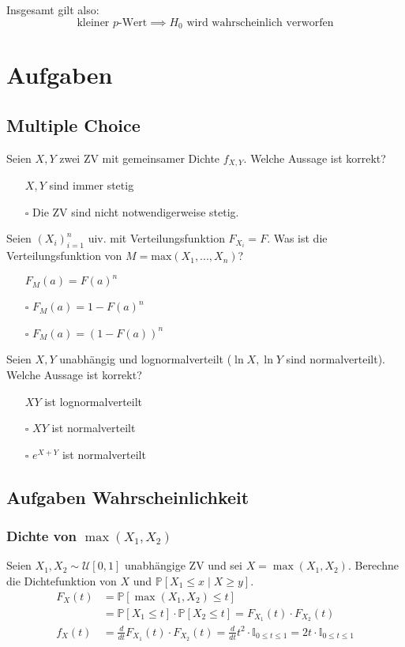\documentclass[a4paper,10pt]{article}
\def\P{\mathbb{P}}
\begin{document}
Insgesamt gilt also:
\[\text{kleiner } p\text{-Wert} \implies H_0 \text{ wird wahrscheinlich verworfen} \]

\section{Aufgaben}
\subsection{Multiple Choice}

Seien \(X,Y\) zwei ZV mit gemeinsamer Dichte \(f_{X,Y}\). Welche Aussage ist korrekt?
\begin{itemize}
	\item[\checkmark] \(X,Y\) sind immer stetig
	\item[\(\square\)] Die ZV sind nicht notwendigerweise stetig.
\end{itemize}

\noindent
Seien \((X_i)_{i = 1}^n\) uiv. mit Verteilungsfunktion \(F_{X_i} = F\). Was ist die Verteilungsfunktion von \(M = \text{max}(X_1,...,X_n)\)?
\begin{itemize}
	\item[\checkmark] \(F_M(a) = F(a)^n\)
	\item[\(\square\)] \(F_M(a) = 1 - F(a)^n\)
	\item[\(\square\)] \(F_M(a) = (1 - F(a))^n\)
\end{itemize}

\noindent
Seien \(X, Y\) unabhängig und lognormalverteilt (\(\ln X, \ln Y\) sind normalverteilt). Welche Aussage ist korrekt?
\begin{itemize}
	\item[\checkmark] \(XY\) ist lognormalverteilt
	\item[\(\square\)] \(XY\) ist normalverteilt
	\item[\(\square\)] \(e^{X + Y}\) ist normalverteilt
\end{itemize}

\subsection{Aufgaben Wahrscheinlichkeit}
\subsubsection*{\texorpdfstring{Dichte von \(\max(X_1,X_2)\)}{Dichte von max()}}

Seien \(X_1, X_2 \sim \mathcal{U}[0,1]\) unabhängige ZV und sei \(X = \max (X_1, X_2)\). Berechne die Dichtefunktion von \(X\) und \(\P[X_1 \leq x \mid X \geq y]\).
\begin{align*}
	F_X(t) & = \P[\max(X_1, X_2) \leq t]                                                                                                              \\ &= \P[X_1 \leq t] \cdot \P[X_2 \leq t] = F_{X_1}(t) \cdot F_{X_2}(t) \\
	f_X(t) & = \frac{d}{dt} F_{X_1}(t) \cdot F_{X_2}(t) = \frac{d}{dt} t^2 \cdot \mathbb{I}_{0 \leq t \leq 1} = 2t \cdot \mathbb{I}_{0 \leq t \leq 1}
\end{align*}
\end{document}
